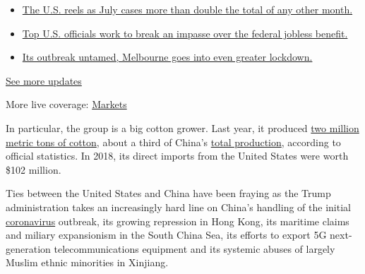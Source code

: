 \begin{itemize}
\tightlist
\item
  \href{https://www.nytimes3xbfgragh.onion/2020/08/01/world/coronavirus-covid-19.html?action=click\&pgtype=Article\&state=default\&region=MAIN_CONTENT_1\&context=storylines_live_updates\#link-34047410}{The
  U.S. reels as July cases more than double the total of any other
  month.}
\item
  \href{https://www.nytimes3xbfgragh.onion/2020/08/01/world/coronavirus-covid-19.html?action=click\&pgtype=Article\&state=default\&region=MAIN_CONTENT_1\&context=storylines_live_updates\#link-780ec966}{Top
  U.S. officials work to break an impasse over the federal jobless
  benefit.}
\item
  \href{https://www.nytimes3xbfgragh.onion/2020/08/01/world/coronavirus-covid-19.html?action=click\&pgtype=Article\&state=default\&region=MAIN_CONTENT_1\&context=storylines_live_updates\#link-2bc8948}{Its
  outbreak untamed, Melbourne goes into even greater lockdown.}
\end{itemize}

\href{https://www.nytimes3xbfgragh.onion/2020/08/01/world/coronavirus-covid-19.html?action=click\&pgtype=Article\&state=default\&region=MAIN_CONTENT_1\&context=storylines_live_updates}{See
more updates}

More live coverage:
\href{https://www.nytimes3xbfgragh.onion/live/2020/07/31/business/stock-market-today-coronavirus?action=click\&pgtype=Article\&state=default\&region=MAIN_CONTENT_1\&context=storylines_live_updates}{Markets}

In particular, the group is a big cotton grower. Last year, it produced
\href{http://www.xjbt.gov.cn/c/2020-04-26/7346731.shtml?ad_check=1}{two
million metric tons of cotton}, about a third of China's
\href{http://www.stats.gov.cn/tjsj/zxfb/201912/t20191217_1718007.html}{total
production}, according to official statistics. In 2018, its direct
imports from the United States were worth \$102 million.

Ties between the United States and China have been fraying as the Trump
administration takes an increasingly hard line on China's handling of
the initial
\href{https://www.nytimes3xbfgragh.onion/news-event/coronavirus}{coronavirus}
outbreak, its growing repression in Hong Kong, its maritime claims and
miliary expansionism in the South China Sea, its efforts to export 5G
next-generation telecommunications equipment and its systemic abuses of
largely Muslim ethnic minorities in Xinjiang.

